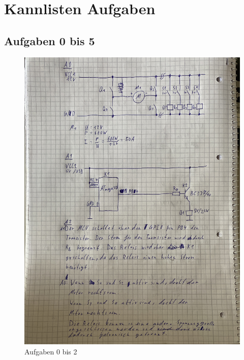 \documentclass{article}
\begin{document}
\section{Kannlisten Aufgaben}

\subsection{Aufgaben 0 bis 5}
\begin{figure}[H]
    \centering
    \includegraphics[angle=270, width=0.9\linewidth]{A0_to_A2.jpg}
    \caption{Aufgaben 0 bis 2}
\end{figure}
\end{document}
